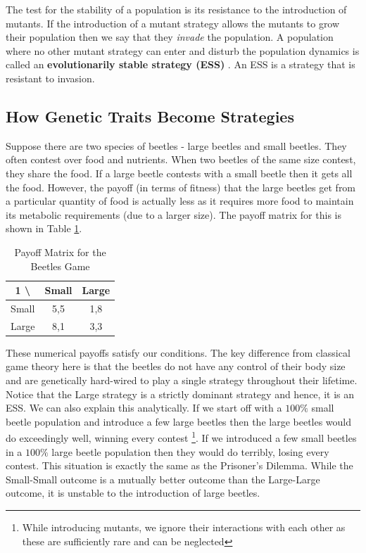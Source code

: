 \documentclass{article}
\theoremstyle{definition}
\begin{document}
The test for the stability of a population is its resistance to the introduction of mutants. If the introduction of a mutant strategy allows the mutants to grow their population then we say that they \textit{invade} the population. A population where no other mutant strategy can enter and disturb the population dynamics is called an \textbf{evolutionarily stable strategy (ESS) }. An ESS is a strategy that is resistant to invasion.

\subsection{How Genetic Traits Become Strategies}

Suppose there are two species of beetles - large beetles and small beetles. They often contest over food and nutrients. When two beetles of the same size contest, they share the food. If a large beetle contests with a small beetle then it gets all the food. However, the payoff (in terms of fitness) that the large beetles get from a particular quantity of food is actually less as it requires more food to maintain its metabolic requirements (due to a larger size). The payoff matrix for this is shown in Table \ref{table:beetle}.

\begin{table}[H]
    \begin{adjustbox}{center}
    \begin{tabular}{|c|c|c|}
        \hline
         1 \textbackslash \; 2 & Small & Large \\
        \hline
        Small & 5,5 & 1,8 \\
        \hline 
        Large & 8,1 & 3,3  \\
        \hline
    \end{tabular}
    \end{adjustbox}
    \caption{Payoff Matrix for the Beetles Game}
    \label{table:beetle}
\end{table}

These numerical payoffs satisfy our conditions. The key difference from classical game theory here is that the beetles do not have any control of their body size and are genetically hard-wired to play a single strategy throughout their lifetime. Notice that the Large strategy is a strictly dominant strategy and hence, it is an ESS. We can also explain this analytically. If we start off with a $100\%$ small beetle population and introduce a few large beetles then the large beetles would do exceedingly well, winning every contest \footnote{While introducing mutants, we ignore their interactions with each other as these are sufficiently rare and can be neglected}. If we introduced a few small beetles in a $100\%$ large beetle population then they would do terribly, losing every contest. This situation is exactly the same as the Prisoner's Dilemma. While the Small-Small outcome is a mutually better outcome than the Large-Large outcome, it is unstable to the introduction of large beetles. \medskip
\end{document}
